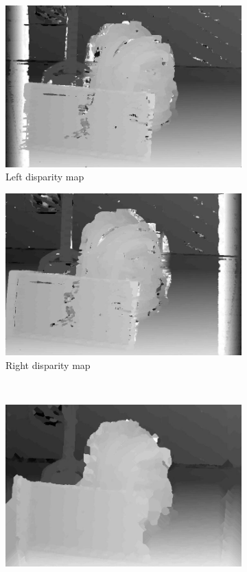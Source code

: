 \documentclass[conference]{IEEEtran}
\begin{document}
{\begin{figure}[t!]
\centering
	\begin{subfigure}{0.49\linewidth}
		\centering
		\includegraphics[scale=0.2]{./figures/left_dm.jpg}
 		\caption{Left disparity map}\label{subfig:leftDisparity}
	\end{subfigure}
	\begin{subfigure}{0.49\linewidth}
		\centering
		\includegraphics[scale=0.2]{./figures/right_dm.jpg}
 		\caption{Right disparity map}\label{subfig:rightDisparity}
	\end{subfigure}
\\
	\begin{subfigure}{\linewidth}
		\centering
		\includegraphics[scale=0.43]{./figures/final_dm.jpg}

\end{subfigure}
\end{figure}}
\end{document}
